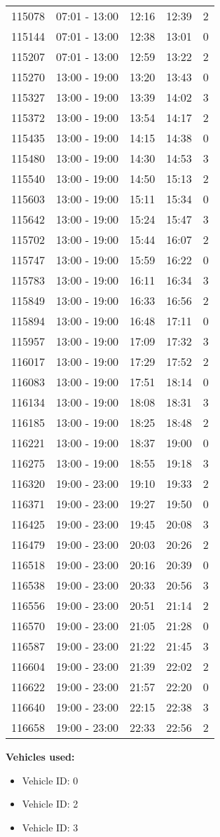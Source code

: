 \documentclass{article}
\begin{document}
\begin{tabular}{llccc}
115078 & 07:01 - 13:00 & 12:16 & 12:39 & 2 \\
115144 & 07:01 - 13:00 & 12:38 & 13:01 & 0 \\
115207 & 07:01 - 13:00 & 12:59 & 13:22 & 2 \\
115270 & 13:00 - 19:00 & 13:20 & 13:43 & 0 \\
115327 & 13:00 - 19:00 & 13:39 & 14:02 & 3 \\
115372 & 13:00 - 19:00 & 13:54 & 14:17 & 2 \\
115435 & 13:00 - 19:00 & 14:15 & 14:38 & 0 \\
115480 & 13:00 - 19:00 & 14:30 & 14:53 & 3 \\
115540 & 13:00 - 19:00 & 14:50 & 15:13 & 2 \\
115603 & 13:00 - 19:00 & 15:11 & 15:34 & 0 \\
115642 & 13:00 - 19:00 & 15:24 & 15:47 & 3 \\
115702 & 13:00 - 19:00 & 15:44 & 16:07 & 2 \\
115747 & 13:00 - 19:00 & 15:59 & 16:22 & 0 \\
115783 & 13:00 - 19:00 & 16:11 & 16:34 & 3 \\
115849 & 13:00 - 19:00 & 16:33 & 16:56 & 2 \\
115894 & 13:00 - 19:00 & 16:48 & 17:11 & 0 \\
115957 & 13:00 - 19:00 & 17:09 & 17:32 & 3 \\
116017 & 13:00 - 19:00 & 17:29 & 17:52 & 2 \\
116083 & 13:00 - 19:00 & 17:51 & 18:14 & 0 \\
116134 & 13:00 - 19:00 & 18:08 & 18:31 & 3 \\
116185 & 13:00 - 19:00 & 18:25 & 18:48 & 2 \\
116221 & 13:00 - 19:00 & 18:37 & 19:00 & 0 \\
116275 & 13:00 - 19:00 & 18:55 & 19:18 & 3 \\
116320 & 19:00 - 23:00 & 19:10 & 19:33 & 2 \\
116371 & 19:00 - 23:00 & 19:27 & 19:50 & 0 \\
116425 & 19:00 - 23:00 & 19:45 & 20:08 & 3 \\
116479 & 19:00 - 23:00 & 20:03 & 20:26 & 2 \\
116518 & 19:00 - 23:00 & 20:16 & 20:39 & 0 \\
116538 & 19:00 - 23:00 & 20:33 & 20:56 & 3 \\
116556 & 19:00 - 23:00 & 20:51 & 21:14 & 2 \\
116570 & 19:00 - 23:00 & 21:05 & 21:28 & 0 \\
116587 & 19:00 - 23:00 & 21:22 & 21:45 & 3 \\
116604 & 19:00 - 23:00 & 21:39 & 22:02 & 2 \\
116622 & 19:00 - 23:00 & 21:57 & 22:20 & 0 \\
116640 & 19:00 - 23:00 & 22:15 & 22:38 & 3 \\
116658 & 19:00 - 23:00 & 22:33 & 22:56 & 2 \\
\bottomrule
\end{tabular}

\textbf{Vehicles used:}
\begin{itemize}
  \item Vehicle ID: 0
  \item Vehicle ID: 2
  \item Vehicle ID: 3
\end{itemize}
\end{document}
